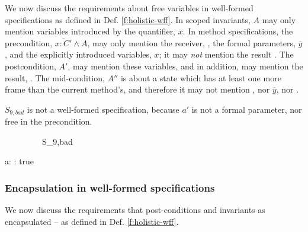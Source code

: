 We now discuss the requirements about free variables in well-formed specifications as defined in Def. \ref{f:holistic-wff}.
 In scoped invariants, $A$ may only mention   variables introduced by the quantifier, $\overline x$. In method specifications, the precondition, $\overline{x:C'} \wedge A$, may only mention the receiver, , the formal parameters, $\overline y$, and the explicitly introduced  variables, $\overline x$; it may \emph{not}  mention the result  . The postcondition, $A'$, may mention these variables, and in addition, may mention the result, . The mid-condition, $A''$ is about a state which has at least one more frame than the current method's,
and therefore it  may not mention , nor $\overline{y}$, nor .

 \begin{example}
$S_{9,bad}$ is not a well-formed specification, because $a'$ is not a formal parameter, nor free in the precondition. 

 {\sprepost
		{\strut \ \ \ \ \ \ \ \ \ S_{9,bad} }
		{  a: \wedge  {} }
		{} {} {:}
		{   \wedge  {}  }
		{  true }
}
		
%
\end{example}

\subsubsection{Encapsulation in well-formed specifications}
\label{wff:spec:encaps:more}

We now discuss the requirements that post-conditions and invariants as encapsulated -- as defined in Def. \ref{f:holistic-wff}.

